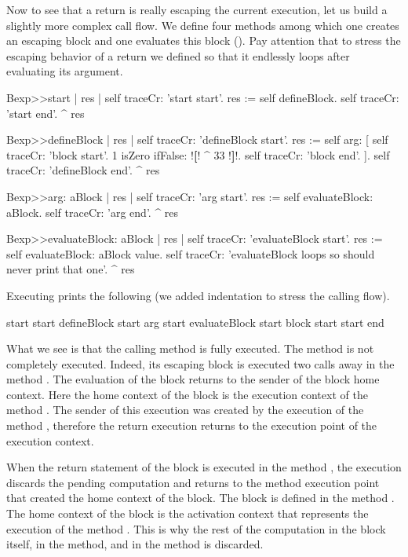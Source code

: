 \documentclass[a4paper,10pt,twoside]{book}
\begin{document}
Now to see that a return is really escaping the current execution, let us build a slightly more complex call flow.
We define four methods among which one creates an escaping block  and one evaluates this block (). Pay attention that to stress the escaping behavior of a return we defined  so that it endlessly loops after evaluating its argument.

\begin{code}{}
Bexp>>start
	| res |
	self traceCr: 'start start'.
	res := self defineBlock.
	self traceCr: 'start end'.
	^ res

Bexp>>defineBlock
	| res |
	self traceCr: 'defineBlock start'.
	res := self arg: [ self traceCr: 'block start'.
                            1 isZero ifFalse: !\textbf{[}! ^ 33 !\textbf{]}!.
                            self traceCr: 'block end'. ].
	self traceCr: 'defineBlock end'.
	^ res

Bexp>>arg: aBlock
	| res |
	self traceCr: 'arg start'.
	res := self evaluateBlock: aBlock.
	self traceCr: 'arg end'.
	^ res

Bexp>>evaluateBlock: aBlock
	| res |
	self traceCr: 'evaluateBlock start'.
	res := self evaluateBlock: aBlock value.
	self traceCr: 'evaluateBlock loops so should never print that one'.
	^  res
\end{code}


Executing   prints the following (we added indentation to stress the calling flow).

\begin{code}{}
start start
   defineBlock start
      arg start
         evaluateBlock start
            block start
start end
\end{code}

What we see is that the calling method  is fully executed. The method  is not completely executed. Indeed, its escaping block \ct{[^33]} is executed two calls away in the method . The evaluation of the block returns to the sender of the block home context. Here the home context of the block is the execution context of the method . The sender of this execution was created by the execution of the method , therefore the return execution returns to the execution point of the  execution context.

When the return statement of the block is executed in the method , the execution discards the pending computation and returns to the method execution point that created the home context of the block. The block is defined in  the method . The home context of the block is the activation context that represents the execution of the method . This is why the rest of the computation in the block itself, in the  method, and in the  method is discarded.
\end{document}
